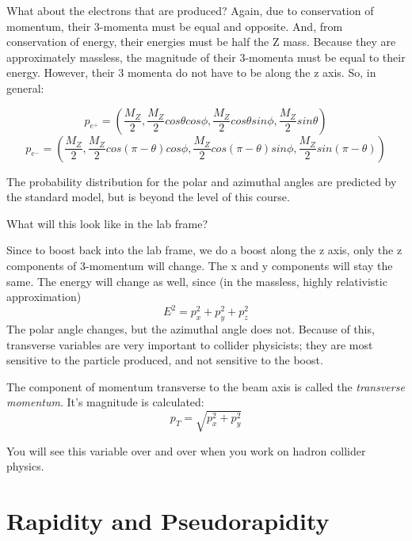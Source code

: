 \noindent What about the electrons that are produced?  Again, due to conservation of momentum, their 3-momenta must be equal and opposite.  And, from conservation of energy, their energies must be half the Z mass.  Because they are approximately massless, the magnitude of their 3-momenta must be equal to their energy.  However, their 3 momenta do not have to be along the z axis.  So, in general:

\begin{equation}
 p_{e^+} = (\frac{M_Z}{2}, \frac{M_Z}{2} cos \theta cos \phi ,  \frac{M_Z}{2} cos \theta sin \phi , \frac{M_Z}{2} sin \theta) 
\end{equation}
\begin{equation}
 p_{e^-} = (\frac{M_Z}{2}, \frac{M_Z}{2} cos (\pi - \theta) cos \phi ,  \frac{M_Z}{2} cos  (\pi - \theta) sin \phi , \frac{M_Z}{2} sin  (\pi - \theta)) 
\end{equation}


	  
The probability distribution for the polar and azimuthal angles are predicted by the standard model, but is beyond the level of this course.

What will this look like in the lab frame?

Since to boost back into the lab frame, we do a boost along the z axis, only the z components of 3-momentum will change.  The x and y components will stay the same.  The energy will change as well, since (in the massless, highly relativistic approximation)
\begin{equation}
E^2 = p_x^2 + p_y^2 + p_z^2   
\end{equation}
The polar angle changes, but the azimuthal angle does not.  Because of this, transverse variables are very important to collider physicists; they are most sensitive to the particle produced, and not sensitive to the boost.

The component of momentum transverse to the beam axis is called the {\it transverse momentum}.  It's magnitude is calculated:
\begin{equation}
	 p_T =   \sqrt{p_x^2 +p_y^2}
\end{equation} 
  

You will see this variable over and over when you work on hadron collider physics.

\section{Rapidity and Pseudorapidity}

